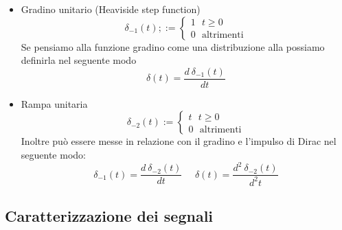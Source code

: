 \documentclass{article}
\theoremstyle{definition}
\newtheorem*{proprieta}{Proprietà}
\begin{document}
\begin{itemize}
$$\begin{cases}
	0 
\end{cases}\right] $$
quindi può essere visualizzato come un segnale il cui punto di applicazione è l'origine , dove assume valore infinito  e la cui area complessiva è unitaria. In realtà l'impulso di Dirac è una distribuzione , quindi un concetto esteso di una funzione \\  Inoltre l'impulso di Dirac gode delle seguente proprietà
\begin{proprieta}
\begin{enumerate}
	\item $\delta(0)=+\infty$
	\item $\delta(t)=0 \ \forall t \neq 0$
	\item $\int_{-\infty}^{+\infty}\delta(t)=1 $ ( la sua area è uno )
	\item Proprietà di campionamento dell'impulso: \\
	Data una funzione v e un $t_0$ in cui la funziona sia continua vale : 
$$v(t_0)=\int_{-\infty}^{+\infty}v(\tau)\delta(\tau-t_0)d\tau=\int_{-\infty}^{+\infty}v(\tau)\delta(t_0-\tau)d\tau$$
\end{enumerate}
\end{proprieta}
\item Gradino unitario (Heaviside step function) 
$$\delta_{-1}(t);:=\begin{cases}
	1 \ \ \ t \geq 0 \\
	0 \ \ \ \text{altrimenti}
\end{cases}$$
Se pensiamo alla funzione gradino come una distribuzione alla possiamo definirla nel seguente modo 
$$\delta(t)=\frac{d\ \delta_{-1}(t)}{dt}$$
\item Rampa unitaria 
$$\delta_{-2}(t):=\begin{cases}
	t \ \ \ t \geq 0 \\
0 \ \ \ \text{altrimenti}
\end{cases}$$
Inoltre può essere messe in relazione con il gradino e l'impulso di Dirac nel seguente modo:
$$\delta_{-1}(t)=\frac{d\ \delta_{-2}(t)}{dt} \ \ \ \ \ \   \delta(t)=\frac{d^2\ \delta_{-2}(t)}{d^2t}$$
\end{itemize}
\subsection{Caratterizzazione dei segnali} 
\end{document}

